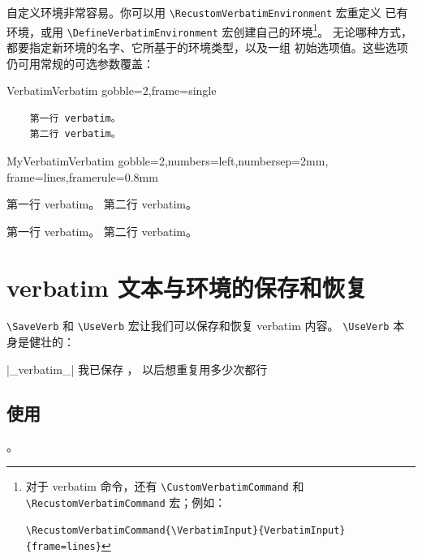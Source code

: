 \documentclass[twoside]{article}
\newif\ifChangeBar \ChangeBarfalse
\newcommand\cs[1]{\texttt{\textbackslash#1}}
\begin{document}
\ifChangeBar\begin{changebar}\fi
\VerbatimFootnotes
  自定义环境非常容易。你可以用 \cs{RecustomVerbatimEnvironment} 宏重定义
已有环境，或用 \cs{DefineVerbatimEnvironment} 宏创建自己的环境\footnote{%
\ifChangeBar\begin{changebar}\fi
对于 verbatim 命令，还有 \cs{CustomVerbatimCommand} 和
\cs{RecustomVerbatimCommand} 宏；例如：

\noindent
\verb+\RecustomVerbatimCommand{\VerbatimInput}{VerbatimInput}{frame=lines}+
\ifChangeBar\end{changebar}\fi}。
无论哪种方式，都要指定新环境的名字、它所基于的环境类型，以及一组
初始选项值。这些选项仍可用常规的可选参数覆盖：

\begin{SideBySideExample}
  \RecustomVerbatimEnvironment
    {Verbatim}{Verbatim}
    {gobble=2,frame=single}
  \begin{Verbatim}
    第一行 verbatim。
    第二行 verbatim。
  \end{Verbatim}
\end{SideBySideExample}
\ifChangeBar\end{changebar}\fi

\begin{SideBySideExample}
  \DefineVerbatimEnvironment%
    {MyVerbatim}{Verbatim}
    {gobble=2,numbers=left,numbersep=2mm,
     frame=lines,framerule=0.8mm}
  \begin{MyVerbatim}
    第一行 verbatim。
    第二行 verbatim。
  \end{MyVerbatim}

  \begin{MyVerbatim}[numbers=none,
                     framerule=1pt]
    第一行 verbatim。
    第二行 verbatim。
  \end{MyVerbatim}
\end{SideBySideExample}

\section{verbatim 文本与环境的保存和恢复}

  \cs{SaveVerb} 和 \cs{UseVerb} 宏让我们可以保存和恢复 verbatim 内容。
\cs{UseVerb} 本身是健壮的：

\begin{SideBySideExample}
  \DefineShortVerb{\|}
  |_verbatim_|
  我已保存 ，
  以后想重复用多少次都行
  \subsection*{使用 }
  。
\end{SideBySideExample}
\end{document}
